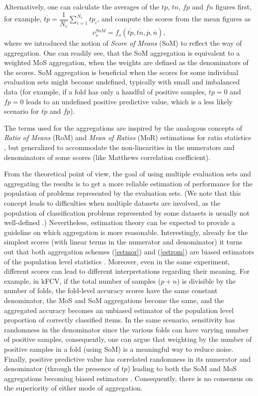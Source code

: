 \documentclass[3p, times]{elsarticle}
\begin{document}
Alternatively, one can calculate the averages of the $tp$, $tn$, $fp$ and $fn$ figures first, for example, $\overline{tp} = \dfrac{1}{N_e}\sum\limits_{i=1}^{N_e} tp_i$, and compute the scores from the mean figures as
\begin{equation}
\label{estrom}
v_s^{SoM} = f_s\left(\overline{tp}, \overline{tn}, \overline{p}, \overline{n}\right),
\end{equation}
where we introduced the notion of \emph{Score of Means} (SoM) to reflect the way of aggregation. One can readily see, that the SoM aggregation is equivalent to a weighted MoS aggregation, when the weights are defined as the denominators of the scores. SoM aggregation is beneficial when the scores for some individual evaluation sets might become undefined, typically with small and imbalanced data \cite{romex0} (for example, if a fold has only a handful of positive samples, $tp=0$ and $fp=0$ leads to an undefined positive predictive value, which is a less likely scenario for $\overline{tp}$ and $\overline{fp}$).

The terms used for the aggregations are inspired by the analogous concepts of \emph{Ratio of Means} (RoM) and \emph{Mean of Ratios} (MoR) estimations for ratio statistics \cite{rommor, rommor2}, but generalized to accommodate the non-linearities in the numerators and denominators of some scores (like Matthews correlation coefficient).

From the theoretical point of view, the goal of using multiple evaluation sets and aggregating the results is to get a more reliable estimation of performance for the population of problems represented by the evaluation sets. (We note that this concept leads to difficulties when multiple datasets are involved, as the population of classification problems represented by some datasets is usually not well-defined \cite{nfl}.) Nevertheless, estimation theory \cite{estimationtheory} can be expected to provide a guideline on which aggregation is more reasonable. Interestingly, already for the simplest scores (with linear terms in the numerator and denominator) it turns out that both aggregation schemes (\ref{estmor}) and (\ref{estrom}) are biased estimators of the population level statistics \cite{rommor2}. Moreover, even in the same experiment, different scores can lead to different interpretations regarding their meaning. For example, in kFCV, if the total number of samples ($p + n$) is divisible by the number of folds, the fold-level accuracy scores have the same constant denominator, the MoS and SoM aggregations become the same, and the aggregated accuracy becomes an unbiased estimator of the population level proportion of correctly classified items. In the same scenario, sensitivity has randomness in the denominator since the various folds can have varying number of positive samples, consequently, one can argue that weighting by the number of positive samples in a fold (using SoM) is a meaningful way to reduce noise. Finally, positive predictive value has correlated randomness in its numerator and denominator (through the presence of $tp$) leading to both the SoM and MoS aggregations becoming biased estimators \cite{rommor2}. Consequently, there is no consensus on the superiority of either mode of aggregation.
\end{document}
